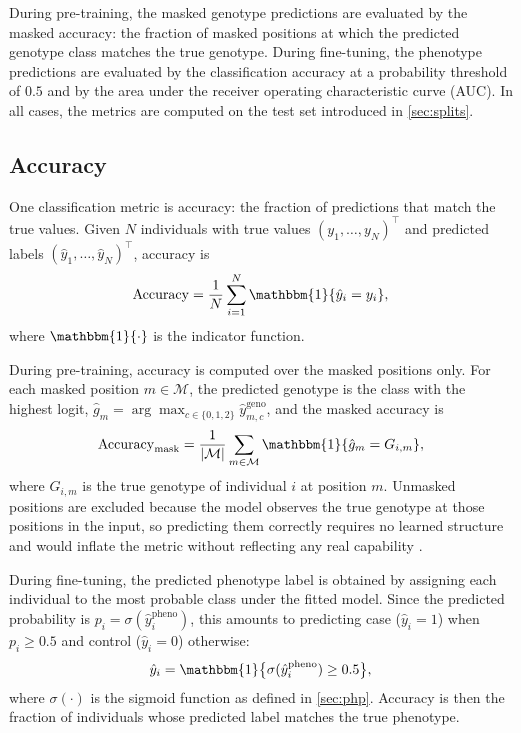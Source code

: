 During pre-training, the masked genotype predictions are evaluated by the
masked accuracy: the fraction of masked positions at which the predicted
genotype class matches the true genotype. During fine-tuning, the
phenotype predictions are evaluated by the classification accuracy at a
probability threshold of $0.5$ and by the area under the receiver
operating characteristic curve (AUC). In all cases, the metrics are
computed on the test set introduced in \autoref{sec:splits}.

\subsection{Accuracy}
\label{sec:accuracy}
One classification metric is accuracy: the fraction of predictions that match the true values. Given $N$ individuals with true values $(y_1, \dots, y_N)^{\top}$ and predicted labels $(\hat{y}_1, \dots, \hat{y}_N)^{\top}$, accuracy is
\begin{align}
    \mathrm{Accuracy} = \frac{1}{N} \sum_{i=1}^{N} \mathbbm{1}\{\hat{y}_i = y_i\},
    \label{eq:accuracy}
\end{align}
where $\mathbbm{1}\{\cdot\}$ is the indicator function.

During pre-training, accuracy is computed over the masked positions only. For each masked position $m \in \mathcal{M}$, the predicted genotype is the class with the highest logit, $\hat{g}_m = \arg\max_{c \in \{0,1,2\}} \hat{y}_{m,c}^{\mathrm{geno}}$, and the masked accuracy is
\begin{align}
    \mathrm{Accuracy}_{\mathrm{mask}} = \frac{1}{|\mathcal{M}|} \sum_{m \in \mathcal{M}} \mathbbm{1}\{\hat{g}_m = G_{i,m}\},
    \label{eq:masked-accuracy}
\end{align}
where $G_{i,m}$ is the true genotype of individual $i$ at position $m$. Unmasked positions are excluded because the model observes the true genotype
at those positions in the input, so predicting them correctly requires no
learned structure and would inflate the metric without reflecting any real
capability \citep{Devlin2019, SNPbag}.

During fine-tuning, the predicted phenotype label is obtained by assigning
each individual to the most probable class under the fitted model. Since
the predicted probability is $p_i = \sigma(\hat{y}^{\mathrm{pheno}}_i)$,
this amounts to predicting case ($\hat{y}_i = 1$) when $p_i \geq 0.5$ and
control ($\hat{y}_i = 0$) otherwise:
\begin{align}
    \hat{y}_i = \mathbbm{1}\bigl\{\sigma(\hat{y}^{\mathrm{pheno}}_i)
    \geq 0.5\bigr\},
    \label{eq:pheno-threshold}
\end{align}
where $\sigma(\cdot)$ is the sigmoid function as defined in
\autoref{sec:php}. Accuracy is then the fraction of individuals whose
predicted label matches the true phenotype.

